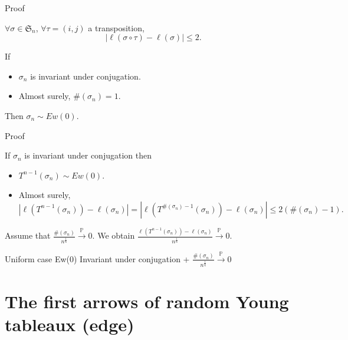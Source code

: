 \documentclass[english]{beamer}
\begin{document}
\begin{frame}{Proof}
\begin{lemma} \label{lem}
 $\forall \sigma \in  \mathfrak{S}_n$,  $ \forall\tau=(i,j)$ a transposition, 
\begin{equation*}
|\ell(\sigma \circ \tau )-\ell(\sigma)|\leq 2.
\end{equation*}
\end{lemma}
\begin{lemma}
If
\begin{itemize}
    \item $\sigma_n$ is invariant under conjugation. 
    \item Almost surely, $\#(\sigma_n)=1$.
\end{itemize}
Then  $\sigma_n \sim Ew(0).$
\end{lemma}
\end{frame}

\begin{frame}{Proof}
\begin{corollary}
If $\sigma_n$ is invariant under conjugation then
\begin{itemize}
    \item $T^{n-1}(\sigma_n)\sim Ew(0).$
    \item Almost surely, $$
|\ell(T^{n-1}(\sigma_n))-\ell(\sigma_n)|=
|\ell(T^{\#(\sigma_n)-1}(\sigma_n))-\ell(\sigma_n)|
\leq  2(\#(\sigma_n)-1).$$
\end{itemize}
Assume that  $\frac{\#(\sigma_n)}{n^\frac16} \overset{\mathbb{P}}\to 0 $.  We obtain $\frac{\ell(T^{n-1}(\sigma_n))-\ell(\sigma_n)}{n^\frac 16} \overset{\mathbb{P}}\to 0$.
\end{corollary}    
Uniform case \Rightarrow Ew(0) \Rightarrow  Invariant under conjugation +   $\frac{\#(\sigma_n)}{n^\frac16} \overset{\mathbb{P}}\to 0 $
\end{frame}
\section{The first arrows of random Young tableaux (edge)}
\end{document}
